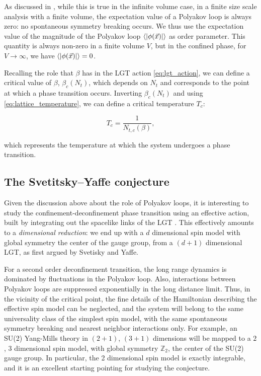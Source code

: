 \documentclass[reqno,12pt]{article}
\numberwithin{equation}{section}
\begin{document}
As discussed in \cite{pepe}, while this is true in the infinite volume case, in a finite size scale analysis with a finite volume, 
the expectation value of a Polyakov loop is always zero: no spontaneous symmetry breaking occurs. We thus use the expectation
value of the magnitude of the Polyakov loop $\expval{|\phi(\vec{x})|}$ as order parameter. This quantity is always non-zero in a finite
volume $V$, but in the confined phase, for $V \rightarrow \infty$, we have $\expval{|\phi(\vec{x})|} = 0$.

Recalling the role that $\beta$ has in the LGT action \eqref{eq:lgt_action}, we can define a critical value of $\beta$, 
$\beta_c(N_t)$, which depends on $N_t$ and corresponds to the point at which a phase transition occurs. Inverting $\beta_c(N_t)$ and
using \eqref{eq:lattice_temperature}, we can define a critical temperature $T_c$:

\begin{equation}
	T_c = \frac{1}{N_{t,c}(\beta)},
\end{equation}

which represents the temperature at which the system undergoes a phase transition.

\subsection{The Svetitsky–Yaffe conjecture}

Given the discussion above about the role of Polyakov loops, it is interesting to study the confinement-deconfinement phase transition
using an effective action, built by integrating out the spacelike links of the LGT \cite{caristo} \cite{caselle}. This effectively
amounts to a \textit{dimensional reduction}: we end up with a $d$ dimensional spin model with global symmetry the center of the
gauge group, from a $(d+1)$ dimensional LGT, as first argued by Svetisky and Yaffe.

For a second order deconfinement transition, the long range dynamics is dominated by fluctuations in the Polyakov loop. Also,
interactions between Polyakov loops are suppressed exponentially in the long distance limit. Thus, in the vicinity of the 
critical point, the fine details of the Hamiltonian describing the effective spin model can be neglected, and the system will belong
to the same universality class of the simplest spin model, with the same spontaneous symmetry breaking and nearest neighbor interactions
only. For example, an SU(2) Yang-Mills theory in $(2+1)$, $(3+1)$ dimensions will be mapped to a $2$, $3$ dimensional spin model, with
global symmetry $\mathbb{Z}_2$, the center of the SU(2) gauge group. In particular, the 2 dimensional spin model is exactly integrable,
and it is an excellent starting pointing for studying the conjecture. 
\end{document}
